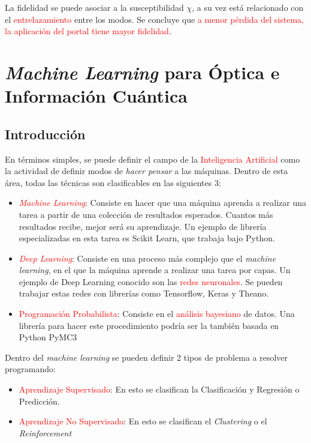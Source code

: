 \documentclass{book}
\begin{document}
La fidelidad se puede asociar a la susceptibilidad $\chi$, a su vez está relacionado con el \textcolor{red}{entrelazamiento} entre los modos. Se concluye que \textcolor{red}{a menor pérdida del sistema, la aplicación del portal tiene mayor fidelidad}.


\chapter{\textit{Machine Learning} para Óptica e Información Cuántica}
\section{Introducción}

En términos simples, se puede definir el campo de la \textcolor{red}{Inteligencia Artificial} como la actividad de definir modos de \textit{hacer pensar} a las máquinas. Dentro de esta área, todas las técnicas son clasificables en las siguientes 3:

\begin{itemize}
    \item \textcolor{red}{\textit{Machine Learning}}: Consiste en hacer que una máquina aprenda a realizar una tarea a partir de una colección de resultados esperados. Cuantos más resultados recibe, mejor será su aprendizaje. Un ejemplo de librería especializadas en esta tarea es \textcolor{fgreen}{Scikit Learn}, que trabaja bajo \textcolor{fgreen}{Python}.
    \item \textcolor{red}{\textit{Deep Learning}}: Consiste en una proceso más complejo que el \textit{machine learning}, en el que la máquina aprende a realizar una tarea por capas. Un ejemplo de Deep Learning conocido son las \textcolor{red}{redes neuronales}. Se pueden trabajar estas redes con librerías como \textcolor{fgreen}{Tensorflow}, \textcolor{fgreen}{Keras} y \textcolor{fgreen}{Theano}.
    \item \textcolor{red}{Programación Probabilista}: Consiste en el \textcolor{red}{análisis bayesiano} de datos. Una librería para hacer este procedimiento podría ser la también basada en \textcolor{fgreen}{Python} \textcolor{fgreen}{PyMC3}
\end{itemize}

Dentro del \textit{machine learning} se pueden definir 2 tipos de problema a resolver programando:

\begin{itemize}
    \item \textcolor{red}{Aprendizaje Supervisado}: En esto se clasifican la Clasificación y Regresión o Predicción.
    \item \textcolor{red}{Aprendizaje No Supervisado}: En esto se clasifican el \textit{Clustering} o el \textit{Reinforcement}
\end{itemize}
\end{document}
